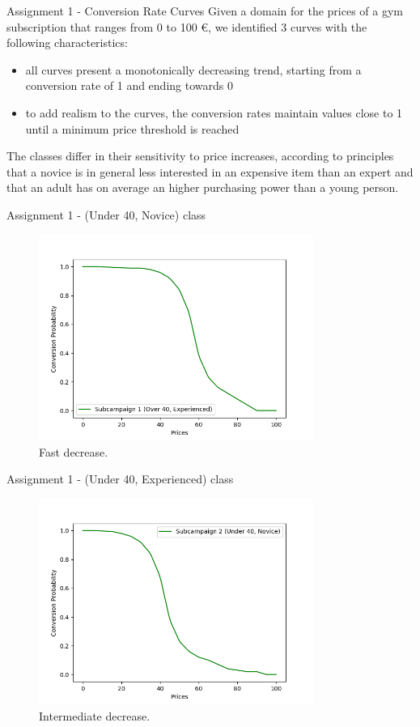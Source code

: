 \documentclass[11pt]{beamer}
\begin{document}
\begin{frame}{Assignment 1 - Conversion Rate Curves}
Given a domain for the prices of a gym subscription that ranges from 0 to 100 €, we identified 3 curves with the following characteristics:
\begin{itemize}
\item all curves present a monotonically decreasing trend, starting from a conversion rate of 1 and ending towards 0
\item to add realism to the curves, the conversion rates maintain values close to 1 until a minimum price threshold is reached  
\end{itemize}
The classes differ in their sensitivity to price increases, according to principles that a novice is in general less interested in an expensive item than an expert and that an adult has on average an higher purchasing power than a young person.

\end{frame}

\begin{frame}{Assignment 1 - (Under 40, Novice) class}
\begin{figure}[hbtp]
\centering
\includegraphics[width=0.8\textwidth]{images/demand_curve_1.png}
\caption{Fast decrease.}
\end{figure}
\end{frame}

\begin{frame}{Assignment 1 - (Under 40, Experienced) class}
\begin{figure}[hbtp]
\centering
\includegraphics[width=0.8\textwidth]{images/demand_curve_2.png}
\caption{Intermediate decrease.}
\end{figure}
\end{frame}
\end{document}
